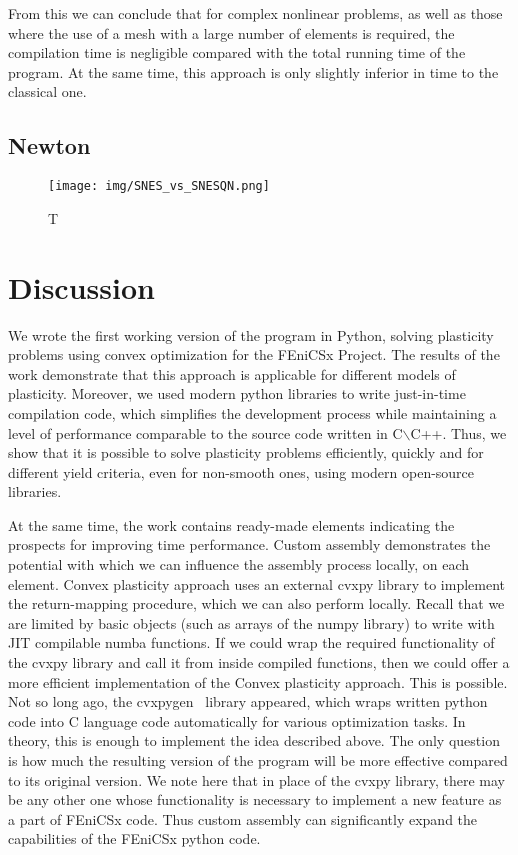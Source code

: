 \documentclass[12pt]{article}
\begin{document}
From this we can conclude that for complex nonlinear problems, as well as those where the use of a mesh with a large number of elements is required, the compilation time is negligible compared with the total running time of the program. At the same time, this approach is only slightly inferior in time to the classical one.

\subsection{Newton}

\begin{figure}[H]
    \center
    \texttt{[image: img/SNES\_vs\_SNESQN.png]}
    \caption{T}
\end{figure}

\newpage
\section{Discussion}

We wrote the first working version of the program in Python, solving plasticity problems using convex optimization for the FEniCSx Project. The results of the work demonstrate that this approach is applicable for different models of plasticity. Moreover, we used modern python libraries to write just-in-time compilation code, which simplifies the development process while maintaining a level of performance comparable to the source code written in C$\backslash$C++. Thus, we show that it is possible to solve plasticity problems efficiently, quickly and for different yield criteria, even for non-smooth ones, using modern open-source libraries. 

At the same time, the work contains ready-made elements indicating the prospects for improving time performance. Custom assembly demonstrates the potential with which we can influence the assembly process locally, on each element. Convex plasticity approach uses an external cvxpy library to implement the return-mapping procedure, which we can also perform locally. Recall that we are limited by basic objects (such as arrays of the numpy library) to write with JIT compilable numba functions. If we could wrap the required functionality of the cvxpy library and call it from inside compiled functions, then we could offer a more efficient implementation of the Convex plasticity approach. This is possible. Not so long ago, the cvxpygen~\parencite{cvxpygen2022} library appeared, which wraps written python code into C language code automatically for various optimization tasks. In theory, this is enough to implement the idea described above. The only question is how much the resulting version of the program will be more effective compared to its original version. We note here that in place of the cvxpy library, there may be any other one whose functionality is necessary to implement a new feature as a part of FEniCSx code. Thus custom assembly can significantly expand the capabilities of the FEniCSx python code.
\end{document}
